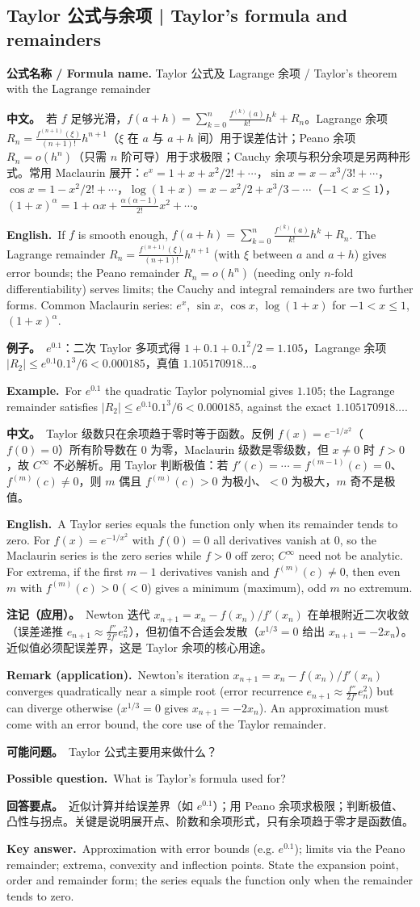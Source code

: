 \documentclass[UTF8,11pt,a4paper]{ctexart}
\newcommand{\BOTH}[2]{\par\noindent\textbf{中文。}\ #1\par\noindent\textbf{English.}\ #2\par}
\newcommand{\EX}[2]{\par\noindent\textbf{例子。}\ #1\par\noindent\textbf{Example.}\ #2\par}
\newcommand{\FORMULA}[2]{\par\noindent\textbf{公式名称 / Formula name.} #1 / #2\par}
\newcommand{\ASK}[4]{\begin{samepage}\par\noindent\textbf{可能问题。}\ #1\par\noindent\textbf{Possible question.}\ #2\par\noindent\textbf{回答要点。}\ #3\par\noindent\textbf{Key answer.}\ #4\medskip\end{samepage}}
\newcommand{\REMARK}[2]{\par\noindent\textbf{注记（应用）。}\ #1\par\noindent\textbf{Remark (application).}\ #2\par}
\begin{document}
\subsection{Taylor 公式与余项 | Taylor's formula and remainders}
\FORMULA{Taylor 公式及 Lagrange 余项}{Taylor's theorem with the Lagrange remainder}
\BOTH{若 $f$ 足够光滑，$f(a+h)=\sum_{k=0}^{n}\frac{f^{(k)}(a)}{k!}h^k+R_n$。Lagrange 余项 $R_n=\frac{f^{(n+1)}(\xi)}{(n+1)!}h^{n+1}$（$\xi$ 在 $a$ 与 $a+h$ 间）用于误差估计；Peano 余项 $R_n=o(h^n)$（只需 $n$ 阶可导）用于求极限；Cauchy 余项与积分余项是另两种形式。常用 Maclaurin 展开：$e^x=1+x+x^2/2!+\cdots$，$\sin x=x-x^3/3!+\cdots$，$\cos x=1-x^2/2!+\cdots$，$\log(1+x)=x-x^2/2+x^3/3-\cdots$（$-1<x\le1$），$(1+x)^\alpha=1+\alpha x+\frac{\alpha(\alpha-1)}{2!}x^2+\cdots$。}{If $f$ is smooth enough, $f(a+h)=\sum_{k=0}^{n}\frac{f^{(k)}(a)}{k!}h^k+R_n$. The Lagrange remainder $R_n=\frac{f^{(n+1)}(\xi)}{(n+1)!}h^{n+1}$ (with $\xi$ between $a$ and $a+h$) gives error bounds; the Peano remainder $R_n=o(h^n)$ (needing only $n$-fold differentiability) serves limits; the Cauchy and integral remainders are two further forms. Common Maclaurin series: $e^x$, $\sin x$, $\cos x$, $\log(1+x)$ for $-1<x\le1$, $(1+x)^\alpha$.}
\EX{$e^{0.1}$：二次 Taylor 多项式得 $1+0.1+0.1^2/2=1.105$，Lagrange 余项 $|R_2|\le e^{0.1}0.1^3/6<0.000185$，真值 $1.105170918\ldots$。}{For $e^{0.1}$ the quadratic Taylor polynomial gives $1.105$; the Lagrange remainder satisfies $|R_2|\le e^{0.1}0.1^3/6<0.000185$, against the exact $1.105170918\ldots$.}
\BOTH{Taylor 级数只在余项趋于零时等于函数。反例 $f(x)=e^{-1/x^2}$（$f(0)=0$）所有阶导数在 $0$ 为零，Maclaurin 级数是零级数，但 $x\ne0$ 时 $f>0$，故 $C^\infty$ 不必解析。用 Taylor 判断极值：若 $f'(c)=\cdots=f^{(m-1)}(c)=0$、$f^{(m)}(c)\ne0$，则 $m$ 偶且 $f^{(m)}(c)>0$ 为极小、$<0$ 为极大，$m$ 奇不是极值。}{A Taylor series equals the function only when its remainder tends to zero. For $f(x)=e^{-1/x^2}$ with $f(0)=0$ all derivatives vanish at $0$, so the Maclaurin series is the zero series while $f>0$ off zero; $C^\infty$ need not be analytic. For extrema, if the first $m-1$ derivatives vanish and $f^{(m)}(c)\ne0$, then even $m$ with $f^{(m)}(c)>0$ ($<0$) gives a minimum (maximum), odd $m$ no extremum.}
\REMARK{Newton 迭代 $x_{n+1}=x_n-f(x_n)/f'(x_n)$ 在单根附近二次收敛（误差递推 $e_{n+1}\approx\frac{f''}{2f'}e_n^2$），但初值不合适会发散（$x^{1/3}=0$ 给出 $x_{n+1}=-2x_n$）。近似值必须配误差界，这是 Taylor 余项的核心用途。}{Newton's iteration $x_{n+1}=x_n-f(x_n)/f'(x_n)$ converges quadratically near a simple root (error recurrence $e_{n+1}\approx\frac{f''}{2f'}e_n^2$) but can diverge otherwise ($x^{1/3}=0$ gives $x_{n+1}=-2x_n$). An approximation must come with an error bound, the core use of the Taylor remainder.}
\ASK{Taylor 公式主要用来做什么？}{What is Taylor's formula used for?}{近似计算并给误差界（如 $e^{0.1}$）；用 Peano 余项求极限；判断极值、凸性与拐点。关键是说明展开点、阶数和余项形式，只有余项趋于零才是函数值。}{Approximation with error bounds (e.g. $e^{0.1}$); limits via the Peano remainder; extrema, convexity and inflection points. State the expansion point, order and remainder form; the series equals the function only when the remainder tends to zero.}
\end{document}
